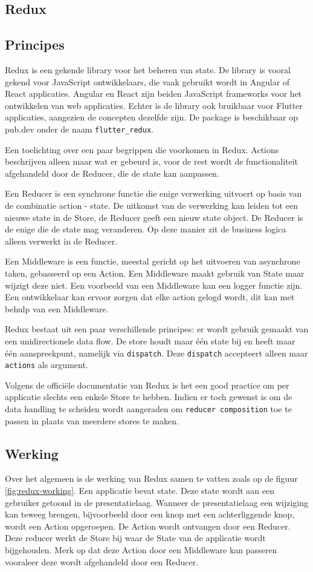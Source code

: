 \subsection{Redux}
\label{ch:redux}
\subsection*{Principes}
Redux is een gekende library voor het beheren van state. De library is vooral gekend voor JavaScript ontwikkelaars, die vaak gebruikt wordt in Angular of React applicaties. Angular en React zijn beiden JavaScript frameworks voor het ontwikkelen van web applicaties. Echter is de library ook bruikbaar voor Flutter applicaties, aangezien de concepten dezelfde zijn. De package is beschikbaar op pub.dev onder de naam \verb|flutter_redux|.

Een toelichting over een paar begrippen die voorkomen in Redux.
Actions beschrijven alleen maar wat er gebeurd is, voor de rest wordt de functionaliteit afgehandeld door de Reducer, die de state kan aanpassen.

Een Reducer is een synchrone functie die enige verwerking uitvoert op basis van de combinatie action - state. De uitkomst van de verwerking kan leiden tot een nieuwe state in de Store, de Reducer geeft een nieuw state object. De Reducer is de enige die de state mag veranderen. Op deze manier zit de business logica alleen verwerkt in de Reducer. 

Een Middleware is een functie, meestal gericht op het uitvoeren van asynchrone taken, gebasseerd op een Action. Een Middleware maakt gebruik van State maar wijzigt deze niet. Een voorbeeld van een Middleware kan een logger functie zijn. Een ontwikkelaar kan ervoor zorgen dat elke action gelogd wordt, dit kan met behulp van een Middleware.

Redux bestaat uit een paar verschillende principes: er wordt gebruik gemaakt van een unidirectionele data flow. De store houdt maar één state bij en heeft maar één aanspreekpunt, namelijk via \verb|dispatch|. Deze \verb|dispatch| accepteert alleen maar \verb|actions| als argument.

Volgens de officiële documentatie van Redux \textcite{Redux2019} is het een good practice om per applicatie slechts een enkele Store te hebben. Indien er toch gewenst is om de data handling te scheiden wordt aangeraden om \verb|reducer composition| toe te passen in plaats van meerdere stores te maken.

\subsection{Werking}
Over het algemeen is de werking van Redux samen te vatten zoals op de figuur \ref{fig:redux-working}. Een applicatie bevat state. Deze state wordt aan een gebruiker getoond in de presentatielaag. Wanneer de presentatielaag een wijziging kan teweeg brengen, bijvoorbeeld door een knop met een achterliggende knop, wordt een Action opgeroepen. De Action wordt ontvangen door een Reducer. Deze reducer werkt de Store bij waar de State van de applicatie wordt bijgehouden. Merk op dat deze Action door een Middleware kan passeren vooraleer deze wordt afgehandeld door een Reducer.

